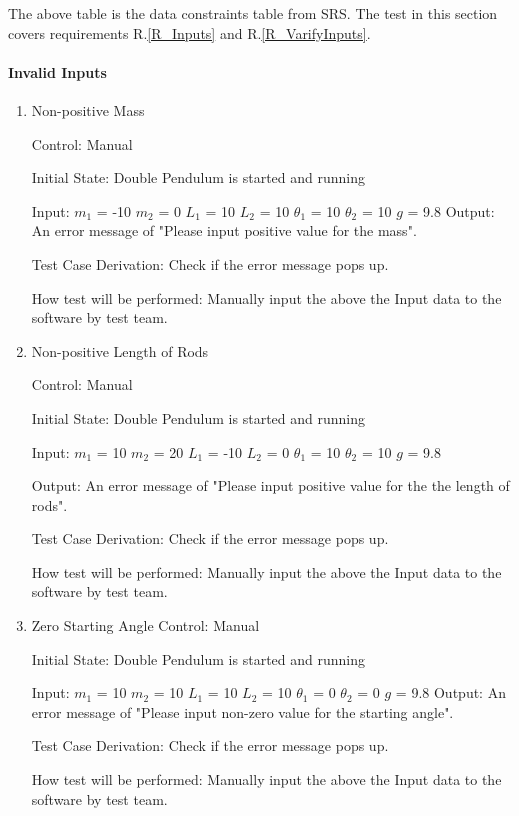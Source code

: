 \documentclass[12pt, titlepage]{article}
\begin{document}
The above table is the data constraints table from SRS. The test in this section covers requirements R.\ref{R_Inputs} and R.\ref{R_VarifyInputs}.

\paragraph{Invalid Inputs}

\begin{enumerate}
					
\item{Non-positive Mass}

Control: Manual  
					
Initial State: Double Pendulum is started and running
					
Input: 
$m_1$ = -10
$m_2$ = 0
$L_1$ = 10
$L_2$	= 10			
$\theta_1$ = 10 
$\theta_2$ = 10
$g$ = 9.8
Output: An error message of "Please input positive value for the mass".

Test Case Derivation: Check if the error message pops up. 

How test will be performed: Manually input the above the Input data to the software by test team. 



\item{Non-positive Length of Rods}  

Control: Manual 
          
Initial State: Double Pendulum is started and running
          
Input: 
$m_1$ = 10
$m_2$ = 20
$L_1$ = -10
$L_2$ = 0      
$\theta_1$ = 10 
$\theta_2$ = 10
$g$ = 9.8
          
Output: An error message of "Please input positive value for the the length of rods".

Test Case Derivation: Check if the error message pops up. 

How test will be performed: Manually input the above the Input data to the software by test team. 
 
          
\item{Zero Starting Angle}  
Control: Manual  
          
Initial State: Double Pendulum is started and running
          
Input: 
$m_1$ = 10
$m_2$ = 10
$L_1$ = 10
$L_2$ = 10      
$\theta_1$ = 0 
$\theta_2$ = 0
$g$ = 9.8
Output: An error message of "Please input non-zero value for the starting angle".

Test Case Derivation: Check if the error message pops up. 

How test will be performed: Manually input the above the Input data to the software by test team. 
\end{enumerate}
\end{document}
